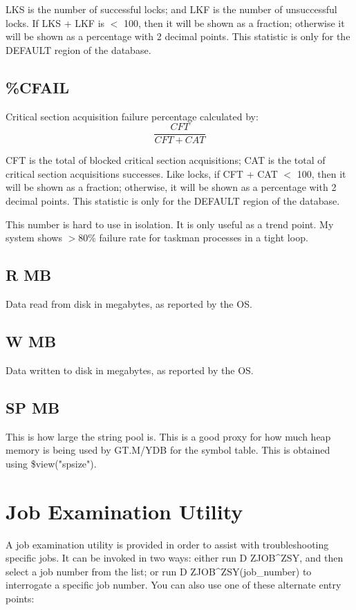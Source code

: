 \documentclass[]{article}
\begin{document}
\begin{multicols}{2}
LKS is the number of successful locks; and LKF is the number of unsuccessful locks.  If LKS + LKF is $<$ 100, then it will be shown as a fraction; otherwise it will be shown as a percentage with 2 decimal points. This statistic is only for the DEFAULT region of the database.

\subsection{\%CFAIL}
Critical section acquisition failure percentage calculated by: \[\frac{CFT}{CFT + CAT}\]

CFT is the total of blocked critical section acquisitions; CAT is the total of critical section acquisitions successes. Like locks, if CFT + CAT $<$ 100, then it will be shown as a fraction; otherwise, it will be shown as a percentage with 2 decimal points. This statistic is only for the DEFAULT region of the database.

This number is hard to use in isolation. It is only useful as a trend point. My system shows $>$80\% failure rate for taskman processes in a tight loop.

\subsection{R MB}
Data read from disk in megabytes, as reported by the OS.

\subsection{W MB}
Data written to disk in megabytes, as reported by the OS.

\subsection{SP MB}
This is how large the string pool is. This is a good proxy for how much heap memory is being used by GT.M/YDB for the symbol table. This is obtained using \$view("spsize").

\end{multicols}
\pagebreak

\section{Job Examination Utility}
A job examination utility is provided in order to assist with troubleshooting specific jobs. It can be invoked in two ways: either run D ZJOB\^{}ZSY, and then select a job number from the list; or run D ZJOB\^{}ZSY(job\_number) to interrogate a specific job number. You can also use one of these alternate entry points:
\end{document}
